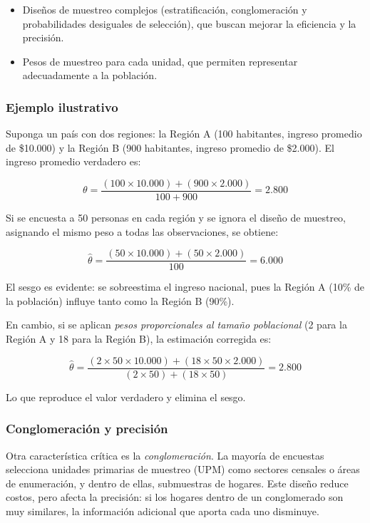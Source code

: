 \documentclass[
  spanish,
  12pt,
]{book}
\providecommand{\tightlist}{%
  \setlength{\itemsep}{0pt}\setlength{\parskip}{0pt}}
\begin{document}
\begin{itemize}
\tightlist
\item
  Diseños de muestreo complejos (estratificación, conglomeración y probabilidades desiguales de selección), que buscan mejorar la eficiencia y la precisión.
\item
  Pesos de muestreo para cada unidad, que permiten representar adecuadamente a la población.
\end{itemize}

\subsubsection{Ejemplo ilustrativo}\label{ejemplo-ilustrativo}

Suponga un país con dos regiones: la Región A (100 habitantes, ingreso promedio de \$10.000) y la Región B (900 habitantes, ingreso promedio de \$2.000). El ingreso promedio verdadero es:

\[
\theta = \frac{(100 \times 10.000) + (900 \times 2.000)}{100 + 900} = 2.800
\]

Si se encuesta a 50 personas en cada región y se ignora el diseño de muestreo, asignando el mismo peso a todas las observaciones, se obtiene:

\[
\hat{\theta} = \frac{(50 \times 10.000) + (50 \times 2.000)}{100} = 6.000
\]

El sesgo es evidente: se sobreestima el ingreso nacional, pues la Región A (10\% de la población) influye tanto como la Región B (90\%).

En cambio, si se aplican \emph{pesos proporcionales al tamaño poblacional} (2 para la Región A y 18 para la Región B), la estimación corregida es:

\[
\hat{\theta} = \frac{(2 \times 50 \times 10.000) + (18 \times 50 \times 2.000)}{(2 \times 50) + (18 \times 50)} = 2.800
\]

Lo que reproduce el valor verdadero y elimina el sesgo.

\subsubsection{Conglomeración y precisión}\label{conglomeraciuxf3n-y-precisiuxf3n}

Otra característica crítica es la \emph{conglomeración}. La mayoría de encuestas selecciona unidades primarias de muestreo (UPM) como sectores censales o áreas de enumeración, y dentro de ellas, submuestras de hogares. Este diseño reduce costos, pero afecta la precisión: si los hogares dentro de un conglomerado son muy similares, la información adicional que aporta cada uno disminuye.
\end{document}
